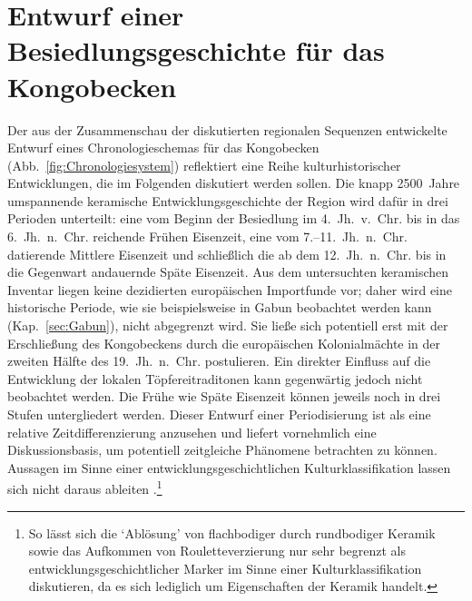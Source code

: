 \section{Entwurf einer Besiedlungsgeschichte für das Kongobecken}\label{sec:Zeitscheiben}	

Der aus der Zusammenschau der diskutierten regionalen Sequenzen entwickelte Entwurf eines Chronologieschemas für das Kongobecken (Abb.~\ref{fig:Chronologiesystem}) reflektiert eine Reihe kulturhistorischer Entwicklungen, die im Folgenden diskutiert werden sollen. Die knapp 2500~Jahre umspannende keramische Entwicklungsgeschichte der Region wird dafür in drei Perioden unterteilt: eine vom Beginn der Besiedlung im 4.~Jh.~v.~Chr. bis in das 6.~Jh.~n.~Chr. reichende Frühen Eisenzeit, eine vom 7.--11.~Jh.~n.~Chr. datierende Mittlere Eisenzeit und schließlich die ab dem 12.~Jh.~n.~Chr. bis in die Gegenwart andauernde Späte Eisenzeit. Aus dem untersuchten keramischen Inventar liegen keine dezidierten europäischen Importfunde vor; daher wird eine historische Periode, wie sie beispielsweise in Gabun beobachtet werden kann (Kap.~\ref{sec:Gabun}), nicht abgegrenzt wird. Sie ließe sich potentiell erst mit der Erschließung des Kongobeckens durch die europäischen Kolonialmächte in der zweiten Hälfte des 19.~Jh.~n.~Chr. postulieren. Ein direkter Einfluss auf die Entwicklung der lokalen Töpfereitraditonen kann gegenwärtig jedoch nicht beobachtet werden. Die Frühe wie Späte Eisenzeit können jeweils noch in drei Stufen untergliedert werden. Dieser Entwurf einer Periodisierung ist als eine relative Zeitdifferenzierung anzusehen und liefert vornehmlich eine Diskussionsbasis, um potentiell zeitgleiche Phänomene betrachten zu können. Aussagen im Sinne einer entwicklungsgeschichtlichen Kulturklassifikation lassen sich nicht daraus ableiten \parencite[siehe][40--43]{Eggert.2012e}.\footnote{So lässt sich die \enquote*{Ablösung} von flachbodiger durch rundbodiger Keramik sowie das Aufkommen von Rouletteverzierung nur sehr begrenzt als entwicklungsgeschichtlicher Marker im Sinne einer Kulturklassifikation diskutieren, da es sich lediglich um Eigenschaften der Keramik handelt.}

